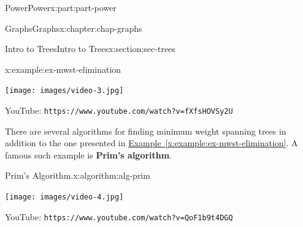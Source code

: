 \documentclass[oneside,10pt,]{book}
\newcommand{\xreffont}{\relax}
\newcommand{\mono}[1]{\texttt{#1}}
\newcommand{\terminology}[1]{\textbf{#1}}
\numberwithin{equation}{section}
\newlength{\qrsize}
\newlength{\previewwidth}
\begin{document}
\begin{partptx}{Power}{}{Power}{}{}{x:part:part-power}
\begin{chapterptx}{Graphs}{}{Graphs}{}{}{x:chapter:chap-graphs}
\begin{sectionptx}{Intro to Trees}{}{Intro to Trees}{}{}{x:section:sec-trees}
\begin{example}{}{x:example:ex-mwst-elimination}
\setlength{\qrsize}{9em}
\setlength{\previewwidth}{\linewidth}
\addtolength{\previewwidth}{-\qrsize}
\begin{tcbraster}[raster columns=2, raster column skip=1pt, raster halign=center, raster force size=false, raster left skip=0pt, raster right skip=0pt]%
\begin{tcolorbox}[previewstyle, width=\previewwidth]%
\texttt{[image: images/video-3.jpg]}%
\end{tcolorbox}%
\begin{tcolorbox}[qrstyle]%
{\hypersetup{urlcolor=black}}%
\end{tcolorbox}%
\begin{tcolorbox}[captionstyle]%
\small YouTube: \mono{https://www.youtube.com/watch?v=fXfsHOVSy2U}\end{tcolorbox}%
\end{tcbraster}%
\end{example}
There are several algorithms for finding minimum weight spanning trees in addition to the one presented in \hyperref[x:example:ex-mwst-elimination]{Example~{\xreffont\ref{x:example:ex-mwst-elimination}}}. A famous such example is \terminology{Prim's algorithm}.%
\begin{algorithm}{Prim's Algorithm.}{}{x:algorithm:alg-prim}%
\setlength{\qrsize}{9em}
\setlength{\previewwidth}{\linewidth}
\addtolength{\previewwidth}{-\qrsize}
\begin{tcbraster}[raster columns=2, raster column skip=1pt, raster halign=center, raster force size=false, raster left skip=0pt, raster right skip=0pt]%
\begin{tcolorbox}[previewstyle, width=\previewwidth]%
\texttt{[image: images/video-4.jpg]}%
\end{tcolorbox}%
\begin{tcolorbox}[qrstyle]%
{\hypersetup{urlcolor=black}}%
\end{tcolorbox}%
\begin{tcolorbox}[captionstyle]%
\small YouTube: \mono{https://www.youtube.com/watch?v=QoF1b9t4DGQ}\end{tcolorbox}%
\end{tcbraster}%
\end{algorithm}
\end{sectionptx}
\end{chapterptx}
%
\typeout{************************************************}

\end{partptx}
\end{document}
